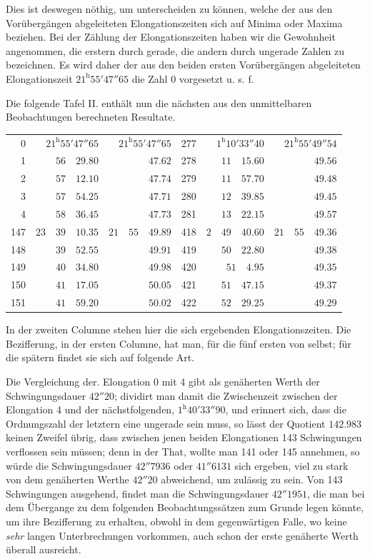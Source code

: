 Dies ist deswegen nöthig, um unterscheiden zu können, welche der aus den Vorübergängen abgeleiteten Elongationszeiten sich auf Minima oder Maxima beziehen. Bei der Zählung der Elongationszeiten haben wir die Gewohnheit angenommen, die erstern durch gerade, die andern durch ungerade Zahlen zu bezeichnen. Es wird daher der aus den beiden ersten Vorübergängen abgeleiteten Elongationszeit $21^{\mathrm{h}}55'47''65$ die Zahl 0 vorgesetzt u. s. f.

Die folgende Tafel II. enthält nun die nächsten aus den unmittelbaren Beobachtungen berechneten Resultate.
\begin{center}
\begingroup\fontsize{9}{11}\selectfont\setlength{\tabcolsep}{4pt}
\begin{tabular}{r|r|r||r|r|r}
0 & $21^{\mathrm{h}}55'47''65$ & $21^{\mathrm{h}}55'47''65$ & 277 & $1^{\mathrm{h}}10'33''40$ & $21^{\mathrm{h}}55'49''54$ \\
1 & $56\quad29.80$ & $47.62$ & 278 & $11\quad15.60$ & $49.56$ \\
2 & $57\quad12.10$ & $47.74$ & 279 & $11\quad57.70$ & $49.48$ \\
3 & $57\quad54.25$ & $47.71$ & 280 & $12\quad39.85$ & $49.45$ \\
4 & $58\quad36.45$ & $47.73$ & 281 & $13\quad22.15$ & $49.57$ \\[7pt]
147 & $23\quad39\quad10.35$ & $21\quad55\quad49.89$ & 418 & $2\quad49\quad40.60$ & $21\quad55\quad49.36$ \\
148 & $39\quad52.55$ & $49.91$ & 419 & $50\quad22.80$ & $49.38$ \\
149 & $40\quad34.80$ & $49.98$ & 420 & $51\quad4.95$ & $49.35$ \\
150 & $41\quad17.05$ & $50.05$ & 421 & $51\quad47.15$ & $49.37$ \\
151 & $41\quad59.20$ & $50.02$ & 422 & $52\quad29.25$ & $49.29$
\end{tabular}\endgroup
\end{center}

In der zweiten Columne stehen hier die sich ergebenden Elongationszeiten. Die Bezifferung, in der ersten Columne, hat man, für die fünf ersten von selbst; für die spätern findet sie sich auf folgende Art.


Die Vergleichung der. Elongation 0 mit 4 gibt als genäherten Werth der Schwingungsdauer $42''20$; dividirt man damit die Zwischenzeit zwischen der Elongation 4 und der nächstfolgenden, $1^{\mathrm{h}}40'33''90$, und erinnert sich, dass die Ordnungszahl der letztern eine ungerade sein muss, so lässt der Quotient $142.983$ keinen Zweifel übrig, dass zwischen jenen beiden Elongationen 143 Schwingungen verflossen sein müssen; denn in der That, wollte man 141 oder 145 annehmen, so würde die Schwingungsdauer $42''7936$ oder $41''6131$ sich ergeben, viel zu stark von dem genäherten Werthe $42''20$ abweichend, um zulässig zu sein. Von 143 Schwingungen ausgehend, findet man die Schwingungsdauer $42''1951$, die man bei dem Übergange zu dem folgenden Beobachtungssätzen zum Grunde legen könnte, um ihre Bezifferung zu erhalten, obwohl in dem gegenwärtigen Falle, wo keine \textit{sehr} langen Unterbrechungen vorkommen, auch schon der erste genäherte Werth überall ausreicht.

